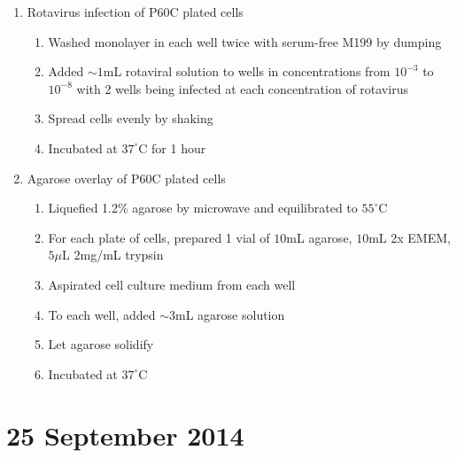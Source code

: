\begin{enumerate}
	\item Rotavirus infection of P60C plated cells
		\begin{enumerate}
			\item Washed monolayer in each well twice with serum-free M199 by dumping
			\item Added $\sim1$mL rotaviral solution to wells in concentrations from $10^{-3}$ to $10^{-8}$ with 2 wells being infected at each concentration of rotavirus
			\item Spread cells evenly by shaking
			\item Incubated at $37^{\circ}$C for 1 hour
		\end{enumerate}
	\item Agarose overlay of P60C plated cells
		\begin{enumerate}
			\item Liquefied 1.2\% agarose by microwave and equilibrated to $55^{\circ}$C
			\item For each plate of cells, prepared 1 vial of $10$mL agarose, $10$mL 2x EMEM, $5\mu$L $2$mg/mL trypsin
			\item Aspirated cell culture medium from each well
			\item To each well, added $\sim3$mL agarose solution
			\item Let agarose solidify
			\item Incubated at $37^{\circ}$C
		\end{enumerate}
\end{enumerate}

\section*{25 September 2014}


